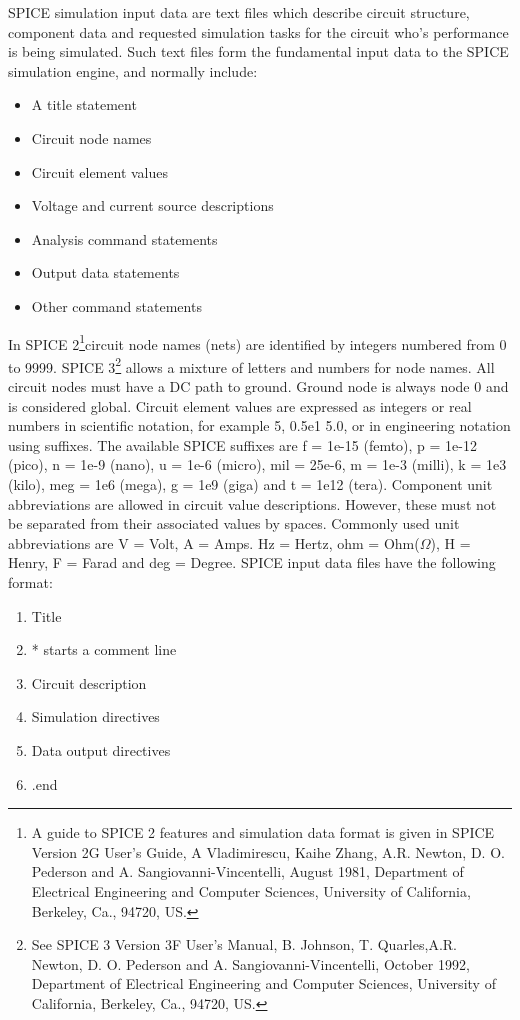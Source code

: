 
SPICE simulation input data are text files which describe circuit structure, component data and requested simulation tasks for the circuit who's performance is being simulated. Such text files form the fundamental input data to the SPICE simulation engine, and normally include:
\begin{itemize}
\item A title statement
\item Circuit node names
\item Circuit element values
\item Voltage and current source descriptions
\item Analysis command statements
\item Output data statements
\item Other command statements
\end{itemize}

In SPICE 2\footnote{A guide to SPICE 2 features and simulation data format is given in SPICE Version 2G User's Guide, A Vladimirescu, Kaihe Zhang, A.R. Newton, D. O. Pederson and A. Sangiovanni-Vincentelli, August 1981, Department of Electrical Engineering and Computer Sciences, University of California, Berkeley, Ca., 94720, US.}circuit node names (nets) are identified by integers numbered from 0 to 9999. SPICE 3\footnote{See SPICE 3 Version 3F User's Manual, B. Johnson, T. Quarles,A.R. Newton, D. O. Pederson and A. Sangiovanni-Vincentelli, October 1992, Department of Electrical Engineering and Computer Sciences, University of California, Berkeley, Ca., 94720, US.} allows a mixture of letters and numbers for node names. All circuit nodes must have a DC path to ground. Ground node is always node 0 and is considered global.  Circuit element values are expressed as integers or real numbers in scientific notation,  for example 5, 0.5e1 5.0, or in engineering notation using suffixes. The available SPICE suffixes are f = 1e-15 (femto), p = 1e-12 (pico), n = 1e-9 (nano), u = 1e-6 (micro), mil = 25e-6, m = 1e-3 (milli), k = 1e3 (kilo), meg = 1e6 (mega), g = 1e9 (giga) and t = 1e12 (tera). Component unit abbreviations are allowed in circuit value descriptions. However, these must not be separated from their associated values by spaces. Commonly used unit abbreviations are V = Volt, A = Amps. Hz = Hertz, ohm = Ohm($\Omega$), H = Henry, F = Farad and deg = Degree. SPICE input data files have the following format:
\begin{enumerate}
\item Title
\item *  starts a comment line
\item Circuit description
\item Simulation directives
\item Data output directives
\item .end
\end{enumerate}

